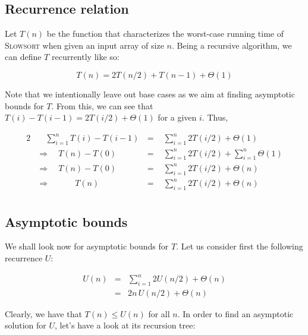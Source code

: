 \documentclass[a4paper,10pt]{article}
\newcommand{\SSort}{\textsc{Slowsort }}
\begin{document}
\subsection{Recurrence relation}

Let $T(n)$ be the function that characterizes the worst-case running time of \SSort when given an input array of size $n$. Being a recursive algorithm, we can define $T$ recurrently like so:

$$T(n) = 2T(n/2) + T(n-1) + \Theta(1)$$

\vspace{0.1cm}
Note that we intentionally leave out base cases as we aim at finding asymptotic bounds for $T$. From this, we can see that $T(i) - T(i-1) = 2T(i/2) + \Theta(1)$ for a given $i$. Thus,

\begin{alignat*}{2}
    &\quad \displaystyle \sum_{i = 1}^{n}{T(i) - T(i-1)} \, &= & \,\, \displaystyle \sum_{i = 1}^{n}{2T(i/2) + \Theta(1)} \\
    &\Rightarrow \quad T(n) - T(0) &=& \,\, \displaystyle \sum_{i = 1}^{n}{2T(i/2)} + \displaystyle \sum_{i = 1}^{n}{\Theta(1)} \\
    &\Rightarrow \quad T(n) - T(0) &=& \,\, \displaystyle \sum_{i = 1}^{n}{2T(i/2)} + \Theta(n) \\
    &\Rightarrow \quad\quad\quad T(n) &=& \,\, \displaystyle \sum_{i = 1}^{n}{2T(i/2)} + \Theta(n) \\
\end{alignat*}

\subsection{Asymptotic bounds}

We shall look now for asymptotic bounds for $T$. Let us consider first the following recurrence $U$:

\begin{eqnarray*}
    U(n) &=& \displaystyle \sum_{i = 1}^{n}{2U(n/2)} + \Theta(n) \\
         &=& 2n \, U(n/2) + \Theta(n)
\end{eqnarray*}

Clearly, we have that $T(n) \leq U(n)$ for all $n$. In order to find an asymptotic solution for $U$, let's have a look at its recursion tree:
\end{document}
